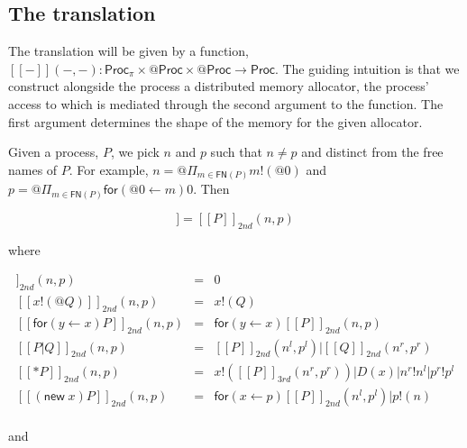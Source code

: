 \documentclass[submission,copyright,creativecommons]{eptcs}
\makeatletter
\newcommand{\ldb}{[\![}
\newcommand{\rdb}{]\!]}
\newcommand{\lliftb}{\langle\!|}
\newcommand{\rliftb}{|\!\rangle}
\newcommand{\id}[1]{\texttt{#1}}
\newcommand{\pzero}{\mathbin{0}}
\newcommand{\freenames}[1]{\mathbin{\mathsf{FN}(#1)}}
\newcommand{\binpar}[2]{#1 | #2}
\newcommand{\outputp}[2]{#1!(#2)}
\newcommand{\lift}[2]{#1 \lliftb #2 \rliftb}
\newcommand{\quotep}[1]{\mathsf{@}#1}
\newcommand{\meaningof}[1]{\ldb #1 \rdb}
\newcommand{\Proc}{\mathsf{Proc}}
\newcommand{\QProc}{\quotep{\mathsf{Proc}}}
\newcommand{\red}{\rightarrow}
\theoremstyle{definition}
\theoremstyle{remark}
\theoremstyle{remark}
\makeatother
\begin{document}
\subsection{The translation}

The translation will be given by a function, $\meaningof{-}( -, - ) :
\Proc_{\pi} \times \QProc \times \QProc \red \Proc$. The guiding
intuition is that we construct alongside the process a distributed memory
allocator, the process' access to which is mediated through the second argument
to the function. The first argument determines the shape of the memory
for the given allocator.

Given a process, $P$, we pick $n$ and $p$ such that $n \neq p$ and
distinct from the free names of $P$. For example, $n = \quotep{\Pi_{m
\in \freenames{P}}\outputp{m}{\quotep{\pzero}}}$ and $p =
\quotep{\Pi_{m \in
\freenames{P}}\mathsf{for}({\quotep{\pzero}} \leftarrow {m}){\pzero}}$. Then

\begin{equation*}
	\meaningof{P} = \meaningof{P}_{2nd}( n, p )
\end{equation*}

where

\begin{eqnarray*}
   	\meaningof{\pzero}_{2nd} (n,p) & = & \pzero \\
   	\meaningof{x!(@Q)}_{2nd} (n,p) & = & x!(Q) \\
   	\meaningof{\mathsf{for}( y \leftarrow x) P}_{2nd} (n,p) 
   		& = & 
 		\mathsf{for}( y \leftarrow x ) \meaningof{P}_{2nd} (n,p) \\
   	\meaningof{P | Q}_{2nd} (n,p) 
   		& = & 
 		\meaningof{P}_{2nd} (n^{l},p^{l}) | \meaningof{Q}_{2nd} (n^{r},p^{r}) \\
   	\meaningof{\mathsf{*} P}_{2nd} (n,p)
   		& = & x!(\meaningof{P}_{3rd}( n^{r}, p^{r} ))|D(x)|n^{r}!n^{l}|p^{r}!p^{l} \\
   	\meaningof{(\mathsf{new} \; x) P}_{2nd} (n,p) 
   		& = & 
 		\mathsf{for}(x \leftarrow p)\meaningof{P}_{2nd} ( n^{l}, p^{l} )|p!(n) \\
\end{eqnarray*}

and
\end{document}
